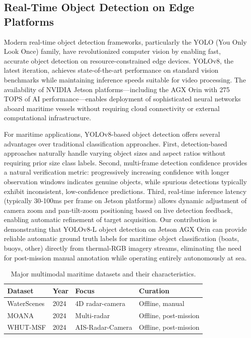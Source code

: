 \documentclass[conf]{asmeconf}
\begin{document}
\subsection{Real-Time Object Detection on Edge Platforms}

Modern real-time object detection frameworks, particularly the YOLO (You Only Look Once) family, have revolutionized computer vision by enabling fast, accurate object detection on resource-constrained edge devices. YOLOv8, the latest iteration, achieves state-of-the-art performance on standard vision benchmarks while maintaining inference speeds suitable for video processing. The availability of NVIDIA Jetson platforms---including the AGX Orin with 275 TOPS of AI performance---enables deployment of sophisticated neural networks aboard maritime vessels without requiring cloud connectivity or external computational infrastructure.

For maritime applications, YOLOv8-based object detection offers several advantages over traditional classification approaches. First, detection-based approaches naturally handle varying object sizes and aspect ratios without requiring prior size class labels. Second, multi-frame detection confidence provides a natural verification metric: progressively increasing confidence with longer observation windows indicates genuine objects, while spurious detections typically exhibit inconsistent, low-confidence predictions. Third, real-time inference latency (typically 30-100ms per frame on Jetson platforms) allows dynamic adjustment of camera zoom and pan-tilt-zoom positioning based on live detection feedback, enabling automatic refinement of target acquisition. Our contribution is demonstrating that YOLOv8-L object detection on Jetson AGX Orin can provide reliable automatic ground truth labels for maritime object classification (boats, buoys, other) directly from thermal-RGB imagery streams, eliminating the need for post-mission manual annotation while operating entirely autonomously at sea.

\begin{table}[t]
\caption{Major multimodal maritime datasets and their characteristics.}
\label{tab:maritime_datasets}
\centering
\footnotesize
\begin{tabular}{@{}llll@{}}
\toprule
Dataset & Year & Focus & Curation \\
\midrule
WaterScenes & 2024 & 4D radar-camera & Offline, manual \\
\midrule
MOANA & 2024 & Multi-radar & Offline, post-mission \\
\midrule
WHUT-MSF & 2024 & AIS-Radar-Camera & Offline, post-mission \\
\bottomrule
\end{tabular}
\end{table}
\end{document}
